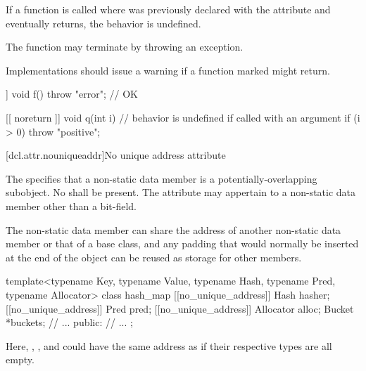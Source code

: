 \pnum
If a function  is called where  was previously declared with the 
attribute and  eventually returns, the behavior is undefined.
\begin{note}
The function may
terminate by throwing an exception.
\end{note}

\pnum
\recommended
Implementations should issue a
warning if a function marked \tcode{[[noreturn]]} might return.

\pnum
\begin{example}
\begin{codeblock}
[[ noreturn ]] void f() {
  throw "error";                // OK
}

[[ noreturn ]] void q(int i) {  // behavior is undefined if called with an argument 
  if (i > 0)
    throw "positive";
}
\end{codeblock}
\end{example}

[dcl.attr.nouniqueaddr]{No unique address attribute}%

\pnum
The  
specifies that a non-static data member
is a potentially-overlapping subobject.
No  shall be present.
The attribute may appertain to a non-static data member
other than a bit-field.

\pnum
\begin{note}
The non-static data member can share the address of
another non-static data member or that of a base class,
and any padding that would normally be inserted
at the end of the object
can be reused as storage for other members.
\end{note}
\begin{example}
\begin{codeblock}
template<typename Key, typename Value,
         typename Hash, typename Pred, typename Allocator>
class hash_map {
  [[no_unique_address]] Hash hasher;
  [[no_unique_address]] Pred pred;
  [[no_unique_address]] Allocator alloc;
  Bucket *buckets;
  // ...
public:
  // ...
};
\end{codeblock}
Here, , , and 
could have the same address as 
if their respective types are all empty.
\end{example}
